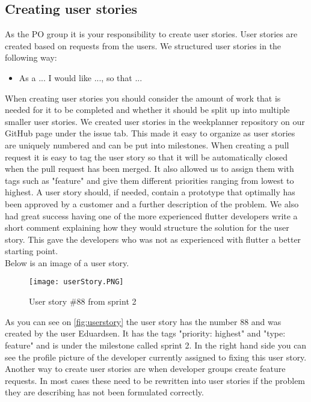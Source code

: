 \subsection{Creating user stories}
As the PO group it is your responsibility to create user stories.
User stories are created based on requests from the users.
We structured user stories in the following way:
\begin{itemize}
    \item As a ... I would like ..., so that ...
\end{itemize}

When creating user stories you should consider the amount of work that is needed for it to be completed and whether it should be split up into multiple smaller user stories.
We created user stories in the weekplanner repository on our GitHub page under the issue tab.
This made it easy to organize as user stories are uniquely numbered and can be put into milestones.
When creating a pull request it is easy to tag the user story so that it will be automatically closed when the pull request has been merged.
It also allowed us to assign them with tags such as "feature" and give them different priorities ranging from lowest to highest.
A user story should, if needed, contain a prototype that optimally has been approved by a customer and a further description of the problem.
We also had great success having one of the more experienced flutter developers write a short comment explaining how they would structure the solution for the user story.
This gave the developers who was not as experienced with flutter a better starting point.
\\
Below is an image of a user story.
\begin{figure}[h]
    \centering
    \texttt{[image: userStory.PNG]}
    \caption{User story \#88 from sprint 2}
    \label{fig:userstory}
\end{figure}
As you can see on \autoref{fig:userstory} the user story has the number 88 and was created by the user Eduardsen.
It has the tags "priority: highest" and "type: feature" and is under the milestone called sprint 2.
In the right hand side you can see the profile picture of the developer currently assigned to fixing this user story.
\\
Another way to create user stories are when developer groups create feature requests.
In most cases these need to be rewritten into user stories if the problem they are describing has not been formulated correctly.

